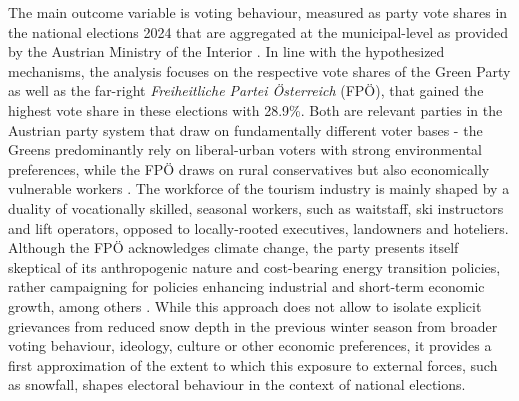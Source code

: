 \documentclass{article}
\begin{document}
The main outcome variable is voting behaviour, measured as party vote shares in the national elections 2024 that are aggregated at the municipal-level as provided by the Austrian Ministry of the Interior \parencite{bmi2024}. In line with the hypothesized mechanisms, the analysis focuses on the respective vote shares of the Green Party as well as the far-right \textit{Freiheitliche Partei Österreich} (FPÖ), that gained the highest vote share in these elections with 28.9\%. Both are relevant parties in the Austrian party system that draw on fundamentally different voter bases - the Greens predominantly rely on liberal-urban voters with strong environmental preferences, while the FPÖ draws on rural conservatives but also economically vulnerable workers \parencite{kritzinger2013}. The workforce of the tourism industry is mainly shaped by a duality of vocationally skilled, seasonal workers, such as waitstaff, ski instructors and lift operators, opposed to locally-rooted executives, landowners and hoteliers.  
Although the FPÖ acknowledges climate change, the party presents itself skeptical of its anthropogenic nature and cost-bearing energy transition policies, rather campaigning for policies enhancing industrial and short-term economic growth, among others \parencite{fpoe2024, ennserjedenastik2016}.
While this approach does not allow to isolate explicit grievances from reduced snow depth in the previous winter season from broader voting behaviour, ideology, culture or other economic preferences, it provides a first approximation of the extent to which this exposure to external forces, such as snowfall, shapes electoral behaviour in the context of national elections. 
\end{document}
